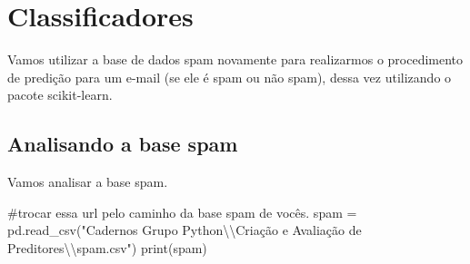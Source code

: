 \documentclass[
  letterpaper,
  DIV=11,
  numbers=noendperiod]{scrreprt}
\newenvironment{Shaded}{\begin{snugshade}}{\end{snugshade}}
\newcommand{\BuiltInTok}[1]{\textcolor[rgb]{0.00,0.23,0.31}{#1}}
\newcommand{\CharTok}[1]{\textcolor[rgb]{0.13,0.47,0.30}{#1}}
\newcommand{\CommentTok}[1]{\textcolor[rgb]{0.37,0.37,0.37}{#1}}
\newcommand{\NormalTok}[1]{\textcolor[rgb]{0.00,0.23,0.31}{#1}}
\newcommand{\OperatorTok}[1]{\textcolor[rgb]{0.37,0.37,0.37}{#1}}
\newcommand{\StringTok}[1]{\textcolor[rgb]{0.13,0.47,0.30}{#1}}
\begin{document}

\hypertarget{classificadores}{%
\chapter{Classificadores}\label{classificadores}}

Vamos utilizar a base de dados spam novamente para realizarmos o
procedimento de predição para um e-mail (se ele é spam ou não spam),
dessa vez utilizando o pacote scikit-learn.

\hypertarget{analisando-a-base-spam}{%
\section{Analisando a base spam}\label{analisando-a-base-spam}}

Vamos analisar a base spam.

\begin{Shaded}
\begin{Highlighting}[]
\CommentTok{\#trocar essa url pelo caminho da base spam de vocês.}
\NormalTok{spam }\OperatorTok{=}\NormalTok{ pd.read\_csv(}\StringTok{"Cadernos Grupo Python}\CharTok{\textbackslash{}\textbackslash{}}\StringTok{Criação e Avaliação de Preditores}\CharTok{\textbackslash{}\textbackslash{}}\StringTok{spam.csv"}\NormalTok{)}
\BuiltInTok{print}\NormalTok{(spam)}
\end{Highlighting}
\end{Shaded}
\end{document}
